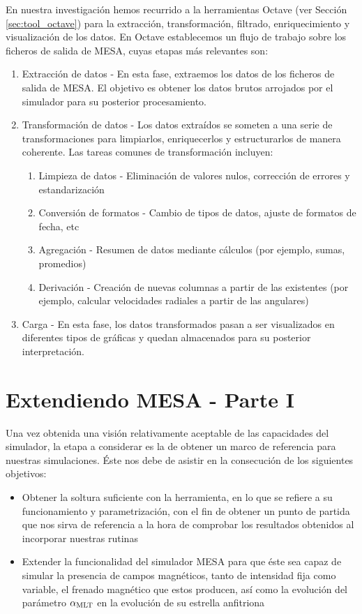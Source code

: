 En nuestra investigación hemos recurrido a la herramientas Octave (ver Sección \ref{sec:tool_octave}) para la extracción, transformación, filtrado, enriquecimiento y visualización de los datos. En Octave establecemos un flujo de trabajo sobre los ficheros de salida de MESA, cuyas etapas más relevantes son:
\begin{enumerate}
	\item Extracción de datos - En esta fase, extraemos los datos de los ficheros de salida de MESA. El objetivo es obtener los datos brutos arrojados por el simulador para su posterior procesamiento.
	\item Transformación de datos - Los datos extraídos se someten a una serie de transformaciones para limpiarlos, enriquecerlos y estructurarlos de manera coherente. Las tareas comunes de transformación incluyen:
	\begin{enumerate}
		\item Limpieza de datos - Eliminación de valores nulos, corrección de errores y estandarización
		\item Conversión de formatos - Cambio de tipos de datos, ajuste de formatos de fecha, etc
		\item Agregación - Resumen de datos mediante cálculos (por ejemplo, sumas, promedios)
		\item Derivación - Creación de nuevas columnas a partir de las existentes (por ejemplo, calcular velocidades radiales a partir de las angulares)
	\end{enumerate}
	\item Carga -  En esta fase, los datos transformados pasan a ser visualizados en diferentes tipos de gráficas y quedan almacenados para su posterior interpretación. 
\end{enumerate}

\section{Extendiendo MESA - Parte I} \label{mesa_parte1}
Una vez obtenida una visión relativamente aceptable de las capacidades del simulador, la etapa a considerar es la de obtener un marco de referencia para nuestras simulaciones. Éste nos debe de asistir en la consecución de los siguientes objetivos:

\begin{itemize}
    \item Obtener la soltura suficiente con la herramienta, en lo que se refiere a su funcionamiento y parametrización, con el fin de obtener un punto de partida que nos sirva de referencia a la hora de comprobar los resultados obtenidos al incorporar nuestras rutinas
    \item Extender la funcionalidad del simulador MESA para que éste sea capaz de simular la presencia de campos magnéticos, tanto de intensidad fija como variable, el frenado magnético que estos producen, así como la evolución del parámetro $\alpha_{\mathrm{MLT}}$ en la evolución de su estrella anfitriona
\end{itemize}

